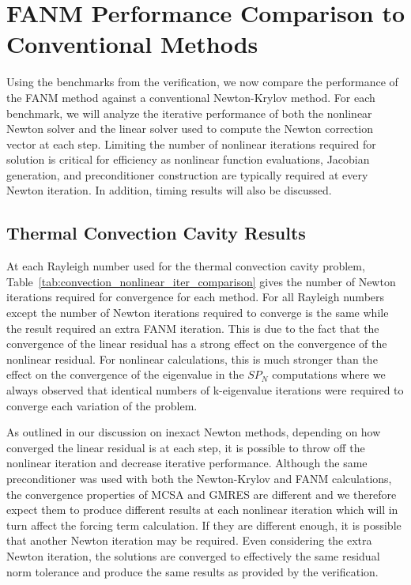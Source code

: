 \clearpage 

\section{FANM Performance Comparison to Conventional Methods\ }
\label{sec:fanm_comparison}

Using the benchmarks from the verification, we now compare the
performance of the FANM method against a conventional Newton-Krylov
method. For each benchmark, we will analyze the iterative performance
of both the nonlinear Newton solver and the linear solver used to
compute the Newton correction vector at each step. Limiting the number
of nonlinear iterations required for solution is critical for
efficiency as nonlinear function evaluations, Jacobian generation, and
preconditioner construction are typically required at every Newton
iteration. In addition, timing results will also be discussed.

\subsection{Thermal Convection Cavity Results}
\label{subsec:thermal_convection_comparison}

At each Rayleigh number used for the thermal convection cavity
problem, Table~\ref{tab:convection_nonlinear_iter_comparison} gives
the number of Newton iterations required for convergence for each
method.  For all Rayleigh numbers except  the number of
Newton iterations required to converge is the same while the 
result required an extra FANM iteration. This is due to the fact that
the convergence of the linear residual has a strong effect on the
convergence of the nonlinear residual. For nonlinear calculations,
this is much stronger than the effect on the convergence of the
eigenvalue in the $SP_N$ computations where we always observed that
identical numbers of k-eigenvalue iterations were required to converge
each variation of the problem.

As outlined in our discussion on inexact Newton methods, depending on
how converged the linear residual is at each step, it is possible to
throw off the nonlinear iteration and decrease iterative
performance. Although the same preconditioner was used with both the
Newton-Krylov and FANM calculations, the convergence properties of
MCSA and GMRES are different and we therefore expect them to produce
different results at each nonlinear iteration which will in turn
affect the forcing term calculation. If they are different enough, it
is possible that another Newton iteration may be required. Even
considering the extra Newton iteration, the solutions are converged to
effectively the same residual norm tolerance and produce the same
results as provided by the verification.

